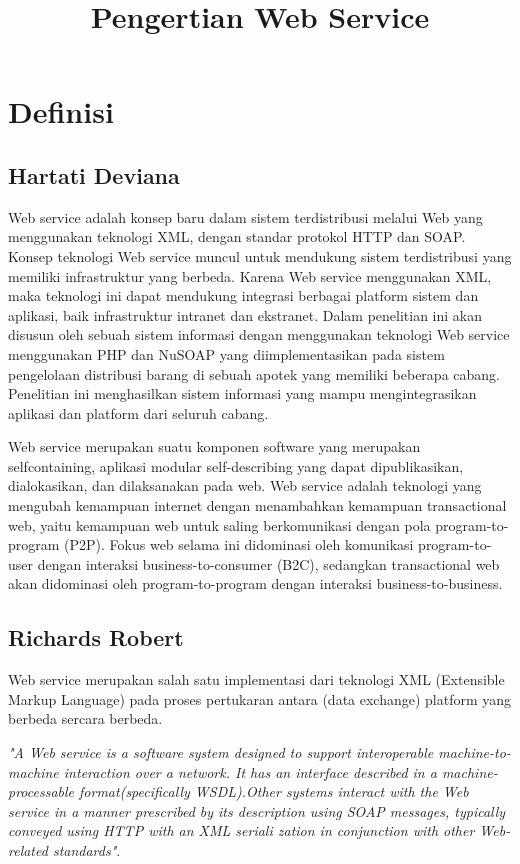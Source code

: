 \documentclass[12pt]{journal}
\begin{document}
\title{Pengertian Web Service}
\maketitle

\section{Definisi}

\subsection{Hartati Deviana}
	Web service adalah konsep baru dalam sistem terdistribusi melalui Web yang menggunakan teknologi XML, dengan standar protokol  HTTP dan SOAP. Konsep teknologi Web service muncul untuk mendukung sistem terdistribusi yang memiliki infrastruktur yang berbeda. Karena Web service menggunakan XML, maka teknologi ini dapat mendukung integrasi berbagai platform sistem dan aplikasi, baik infrastruktur intranet dan ekstranet. Dalam penelitian ini akan disusun oleh sebuah sistem informasi dengan menggunakan teknologi Web service menggunakan PHP dan NuSOAP yang diimplementasikan pada sistem pengelolaan distribusi barang di sebuah apotek yang memiliki beberapa cabang. Penelitian ini menghasilkan sistem informasi yang mampu mengintegrasikan aplikasi dan platform dari seluruh cabang.
	
	Web service merupakan suatu komponen software yang merupakan selfcontaining, aplikasi modular self-describing yang dapat dipublikasikan, dialokasikan, dan dilaksanakan pada web. Web service adalah teknologi yang mengubah kemampuan internet dengan menambahkan kemampuan transactional web, yaitu kemampuan web untuk saling berkomunikasi dengan pola program-to-program (P2P). Fokus web selama ini didominasi oleh komunikasi program-to-user dengan interaksi business-to-consumer (B2C), sedangkan transactional web akan didominasi oleh program-to-program dengan interaksi business-to-business\cite{deviana2013penerapan}.


\subsection{Richards Robert}

Web service merupakan salah satu implementasi dari teknologi XML (Extensible Markup Language) pada proses pertukaran antara (data exchange) platform yang berbeda sercara berbeda.

\textit{"A Web service is a software system designed to support interoperable machine-to-machine interaction over a network. It has an interface described in a machine-processable format(specifically WSDL).Other systems interact with the Web service in a manner prescribed by its description using SOAP messages, typically conveyed using HTTP with an XML seriali zation in conjunction with other Web-related standards"}.
\end{document}

